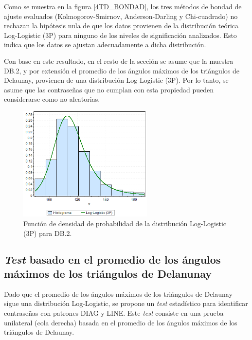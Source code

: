 \documentclass[12pt]{report}
\begin{document}
Como se muestra en la figura \ref{4TD_BONDAD}, los tres métodos de bondad de ajuste evaluados (Kolmogorov-Smirnov, Anderson-Darling y Chi-cuadrado) no rechazan la hipótesis nula de que los datos provienen de la distribución teórica Log-Logistic (3P) para ninguno de los niveles de significación analizados. Esto indica que los datos se ajustan adecuadamente a dicha distribución.

Con base en este resultado, en el resto de la sección se asume que la muestra DB.2, y por extensión el promedio de los ángulos máximos de los triángulos de Delaunay, provienen de una distribución Log-Logistic (3P). Por lo tanto, se asume que las contraseñas que no cumplan con esta propiedad pueden considerarse como no aleatorias.
\newpage
\begin{figure}[ht]
	\centering
	
	\includegraphics[width=0.6\textwidth]{4td_fdp.png}
	\caption{Función de densidad de probabilidad de la  distribución Log-Logistic (3P) para DB.2.}
	\label{4TD_FDP}
\end{figure}
\newpage

\subsection{\textit{Test} basado en el promedio de los ángulos máximos de los triángulos de Delanunay}

Dado que el promedio de los ángulos máximos de los triángulos de Delaunay sigue una distribución Log-Logistic, se propone un \textit{test} estadístico para identificar contraseñas con patrones DIAG y LINE. Este \textit{test} consiste en una prueba unilateral (cola derecha) basada en el promedio de los ángulos máximos de los triángulos de Delaunay.
\end{document}
